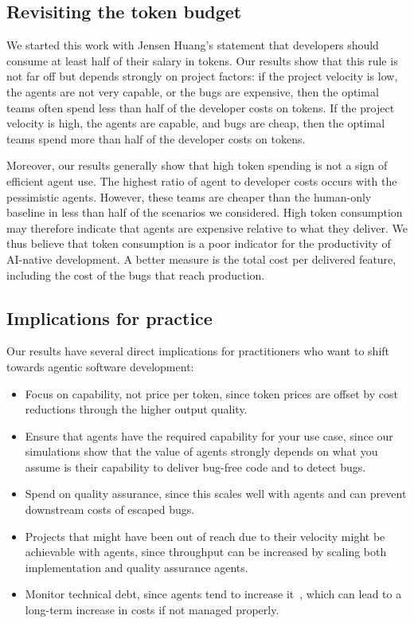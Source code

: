\documentclass[smallextended]{svjour3}       %
\begin{document}
\subsection{Revisiting the token budget}
\label{sec:discussion:huang}

We started this work with Jensen Huang's statement that developers should consume at least half of their salary in tokens. Our results show that this rule is not far off but depends strongly on project factors: if the project velocity is low, the agents are not very capable, or the bugs are expensive, then the optimal teams often spend less than half of the developer costs on tokens. If the project velocity is high, the agents are capable, and bugs are cheap, then the optimal teams spend more than half of the developer costs on tokens. 

Moreover, our results generally show that high token spending is not a sign of efficient agent use. The highest ratio of agent to developer costs occurs with the pessimistic agents. However, these teams are cheaper than the human-only baseline in less than half of the scenarios we considered. High token consumption may therefore indicate that agents are expensive relative to what they deliver. We thus believe that token consumption is a poor indicator for the productivity of AI-native development. A better measure is the total cost per delivered feature, including the cost of the bugs that reach production.

\subsection{Implications for practice}
\label{sec:discussion:practice}

Our results have several direct implications for practitioners who want to shift towards agentic software development: 
\begin{itemize}
  \item Focus on capability, not price per token, since token prices are offset by cost reductions through the higher output quality.
  \item Ensure that agents have the required capability for your use case, since our simulations show that the value of agents strongly depends on what you assume is their capability to deliver bug-free code and to detect bugs.
  \item Spend on quality assurance, since this scales well with agents and can prevent downstream costs of escaped bugs.
  \item Projects that might have been out of reach due to their velocity might be achievable with agents, since throughput can be increased by scaling both implementation and quality assurance agents.
  \item Monitor technical debt, since agents tend to increase it~\citep{he2026cursordebt}, which can lead to a long-term increase in costs if not managed properly.
\end{itemize}
\end{document}
